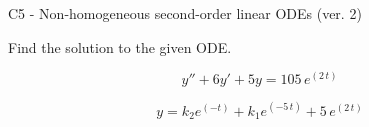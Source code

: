 \begin{exercise}
  \begin{exerciseTitle}C5 - Non-homogeneous second-order linear ODEs (ver. 2)\end{exerciseTitle}
  \begin{exerciseStatement}
    
Find the solution to the given ODE.

    
\[y''+6y'+5y = 105 \, e^{\left(2 \, t\right)}\]

  \end{exerciseStatement}
  \begin{exerciseAnswer}
    
\[y= k_{2} e^{\left(-t\right)} + k_{1} e^{\left(-5 \, t\right)} + 5 \, e^{\left(2 \, t\right)}\]

  \end{exerciseAnswer}
\end{exercise}